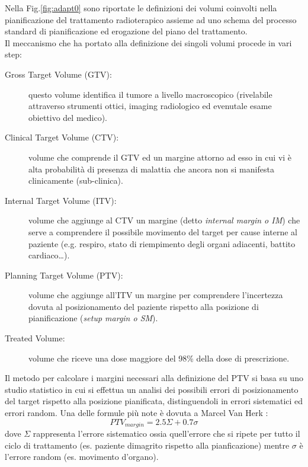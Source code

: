 Nella Fig.\ref{fig:adapt0} sono riportate le definizioni dei volumi coinvolti nella pianificazione del trattamento radioterapico assieme ad uno schema del processo standard di pianificazione ed erogazione del piano del trattamento.\\
Il meccanismo che ha portato alla definizione dei singoli volumi procede in vari step:
\begin{description}
\item[Gross Target Volume (GTV):] questo volume identifica il tumore a livello macroscopico (rivelabile attraverso strumenti ottici, imaging radiologico ed evenutale esame obiettivo del medico).

\item[Clinical Target Volume (CTV):] volume che comprende il GTV ed un margine attorno ad esso in cui vi è alta probabilità di presenza di malattia che ancora non si manifesta clinicamente (sub-clinica).

\item[Internal Target Volume (ITV):] volume che aggiunge al CTV un margine (detto \textit{internal margin o IM}) che serve a comprendere il possibile movimento del target per cause interne al paziente (e.g. respiro, stato di riempimento degli organi adiacenti, battito cardiaco\ldots).

\item[Planning Target Volume (PTV):] volume che aggiunge all'ITV un margine per comprendere l'incertezza dovuta al posizionamento del paziente rispetto alla posizione di pianificazione (\textit{setup margin o SM}).

\item[Treated Volume:] volume che riceve una dose maggiore del 98\% della dose di prescrizione.

\end{description}

Il metodo per calcolare i margini necessari alla definizione del PTV si basa su uno studio statistico in cui si effettua un analisi dei possibili errori di posizionamento del target rispetto alla posizione pianificata, distinguendoli in errori sistematici ed errori random. Una delle formule più note è dovuta a Marcel Van Herk \cite{ICRU62}:
\begin{equation}
PTV_{margin} = 2.5\Sigma + 0.7\sigma
\end{equation}
dove $\Sigma$ rappresenta l'errore sistematico ossia quell'errore che si ripete per tutto il ciclo di trattamento (es. paziente dimagrito rispetto alla pianficazione) mentre $\sigma$ è l'errore random (es. movimento d'organo).

